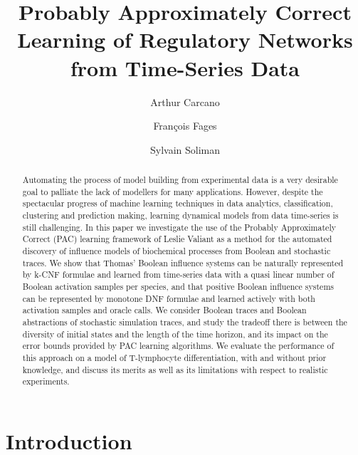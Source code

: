 \documentclass{llncs}
\begin{document}
\title{Probably Approximately Correct Learning of Regulatory Networks from Time-Series Data}

\author{Arthur Carcano \and Fran\c{c}ois Fages \and Sylvain
Soliman}


\maketitle

\begin{abstract}
Automating the process of model building from experimental data 
is a very desirable goal to palliate the lack of modellers for many applications.
However, despite the spectacular progress of machine learning techniques in data analytics, classification, clustering and prediction making,
learning dynamical models from data time-series is still challenging.
In this paper we investigate the use of the Probably Approximately Correct (PAC) learning 
framework of Leslie Valiant as a method for the automated discovery of influence models of biochemical processes from Boolean and stochastic traces. 
We show that Thomas' Boolean influence systems can be naturally represented by k-CNF formulae
and learned
from time-series data with a quasi linear number of Boolean activation samples per species,
and that positive Boolean influence systems can be represented by monotone DNF formulae
and learned actively with both activation samples and oracle calls.
We consider Boolean traces and Boolean abstractions of stochastic simulation traces,
and study the tradeoff there is between the diversity of initial states and the length of the time horizon, 
and its impact on the error bounds provided by PAC learning algorithms.
We evaluate the performance of this approach on a model of T-lymphocyte
differentiation, with and without prior knowledge,
and discuss its merits as well as its limitations with respect to realistic experiments.
\end{abstract}

\section{Introduction}
\end{document}
